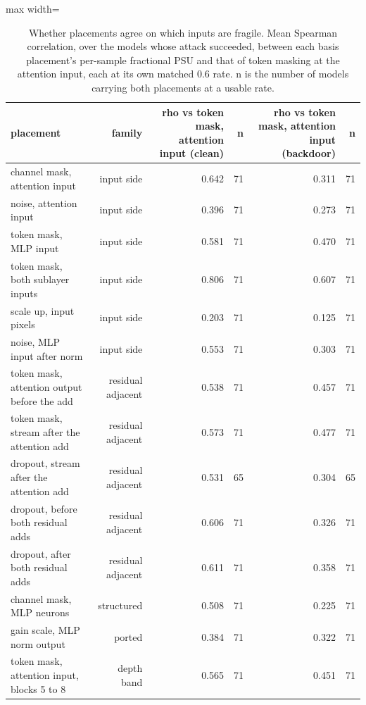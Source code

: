 \begin{table}[htbp]
\centering
\small
\caption{Whether placements agree on which inputs are fragile. Mean Spearman correlation, over the models whose attack succeeded, between each basis placement's per-sample fractional PSU and that of token masking at the attention input, each at its own matched 0.6 rate. n is the number of models carrying both placements at a usable rate.}
\label{tab:mech-operator-agreement}
\begin{adjustbox}{max width=\linewidth}
\begin{tabular}{lrrrrr}
\toprule
placement & family & rho vs token mask, attention input (clean) & n & rho vs token mask, attention input (backdoor) & n \\
\midrule
channel mask, attention input & input side & 0.642 & 71 & 0.311 & 71 \\
noise, attention input & input side & 0.396 & 71 & 0.273 & 71 \\
token mask, MLP input & input side & 0.581 & 71 & 0.470 & 71 \\
token mask, both sublayer inputs & input side & 0.806 & 71 & 0.607 & 71 \\
scale up, input pixels & input side & 0.203 & 71 & 0.125 & 71 \\
noise, MLP input after norm & input side & 0.553 & 71 & 0.303 & 71 \\
token mask, attention output before the add & residual adjacent & 0.538 & 71 & 0.457 & 71 \\
token mask, stream after the attention add & residual adjacent & 0.573 & 71 & 0.477 & 71 \\
dropout, stream after the attention add & residual adjacent & 0.531 & 65 & 0.304 & 65 \\
dropout, before both residual adds & residual adjacent & 0.606 & 71 & 0.326 & 71 \\
dropout, after both residual adds & residual adjacent & 0.611 & 71 & 0.358 & 71 \\
channel mask, MLP neurons & structured & 0.508 & 71 & 0.225 & 71 \\
gain scale, MLP norm output & ported & 0.384 & 71 & 0.322 & 71 \\
token mask, attention input, blocks 5 to 8 & depth band & 0.565 & 71 & 0.451 & 71 \\

\end{tabular}
\end{adjustbox}
\end{table}
